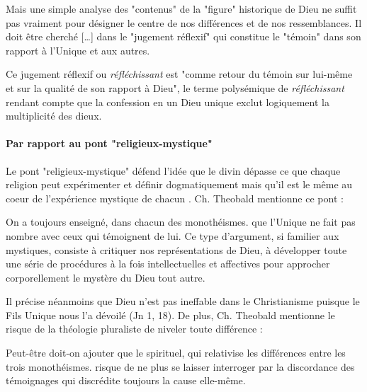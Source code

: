 \begin{singlequote}
    Mais une simple analyse des "contenus" de la "figure" historique de Dieu ne suffit pas vraiment pour désigner le centre de nos différences et de nos ressemblances. Il doit être cherché [\ldots] dans le "jugement réflexif" qui constitue le "témoin" dans son rapport à l'Unique et aux autres.  \cite{centre_sevres_paris_unique_1996}
\end{singlequote}
Ce jugement réflexif ou \textit{réfléchissant} est "comme retour du témoin sur lui-même et sur la qualité de son rapport à Dieu", le terme polysémique de \textit{réfléchissant} rendant compte que la confession en un Dieu unique exclut logiquement la multiplicité des dieux.  
\begin{comment}
    Que Dieu prenne une figure spécifique pour quelqu'un dans une relation de foi, cela ne dit encore rien de son "unicité". Dire que ce Dieu-là existe et qu'il n'existe qu'une seule fois, qu'il est unique, est donc un jugement second, porté par le témoin sur une "figure" de Dieu qui a déjà pris consistance pour lui. On peut l'appeler "jugement réfléchissant" parce qu'il est comme un retour du témoin sur lui-même et sur la qualité de son rapport à Dieu : il intervient, au cœur même de la figure, déjà parce qu'il est - logiquement - impossible de confesser l'Unique sans exclure en même temps, et au moins implicitement, la multiplicité des dieux qui sont donc toujours là comme son ombre éternellement surmontée.
\end{comment}

\paragraph{Par rapport au pont "religieux-mystique"} Le pont "religieux-mystique" défend l'idée que le divin dépasse ce que chaque religion peut expérimenter et définir dogmatiquement mais qu'il est le même au coeur de l'expérience mystique de chacun \cite[p. 92]{cheno_dieu_2017}.  Ch. Theobald mentionne ce pont  : 
\begin{singlequote}
    On a toujours enseigné, dans chacun des monothéismes. que l'Unique ne fait pas nombre avec ceux qui témoignent de lui. Ce type d'argument, si familier aux mystiques, consiste à critiquer nos représentations de Dieu, à développer toute une série de procédures à la fois intellectuelles et affectives pour approcher corporellement le mystère du Dieu tout autre. \cite[p. 791]{theobald_christianisme_2007}
\end{singlequote}
Il précise néanmoins que Dieu n'est pas ineffable dans le Christianisme puisque le Fils Unique nous l'a dévoilé (Jn 1, 18). 
De plus, Ch. Theobald mentionne le risque de la théologie pluraliste de niveler toute différence : 
\begin{singlequote}
    Peut-être doit-on ajouter que le spirituel, qui relativise les différences entre les trois monothéismes. risque de ne plus se laisser interroger par la discordance des témoignages qui discrédite toujours la cause elle-même.\cite[p. 791]{theobald_christianisme_2007}
\end{singlequote}

